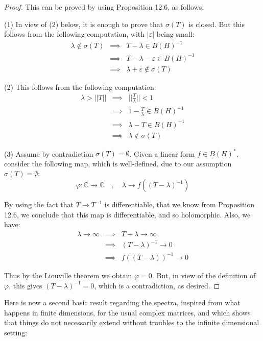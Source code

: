 \documentclass[12pt]{amsbook}
\begin{document}
\begin{proof}
This can be proved by using Proposition 12.6, as follows:

\medskip

(1) In view of (2) below, it is enough to prove that $\sigma(T)$ is closed. But this follows from the following computation, with $|\varepsilon|$ being small:
\begin{eqnarray*}
\lambda\notin\sigma(T)
&\implies&T-\lambda\in B(H)^{-1}\\
&\implies&T-\lambda-\varepsilon\in B(H)^{-1}\\
&\implies&\lambda+\varepsilon\notin\sigma(T)
\end{eqnarray*}

(2) This follows from the following computation:
\begin{eqnarray*}
\lambda>||T||
&\implies&\Big|\Big|\frac{T}{\lambda}\Big|\Big|<1\\
&\implies&1-\frac{T}{\lambda}\in B(H)^{-1}\\
&\implies&\lambda-T\in B(H)^{-1}\\
&\implies&\lambda\notin\sigma(T)
\end{eqnarray*}

(3) Assume by contradiction $\sigma(T)=\emptyset$. Given a linear form $f\in B(H)^*$, consider the following map, which is well-defined, due to our assumption $\sigma(T)=\emptyset$:
$$\varphi:\mathbb C\to\mathbb C\quad,\quad 
\lambda\to f((T-\lambda)^{-1})$$

By using the fact that $T\to T^{-1}$ is differentiable, that we know from Proposition 12.6, we conclude that this map is differentiable, and so holomorphic. Also, we have:
\begin{eqnarray*}
\lambda\to\infty
&\implies&T-\lambda\to\infty\\
&\implies&(T-\lambda)^{-1}\to0\\
&\implies&f((T-\lambda))^{-1}\to0
\end{eqnarray*}

Thus by the Liouville theorem we obtain $\varphi=0$. But, in view of the definition of $\varphi$, this gives $(T-\lambda)^{-1}=0$, which is a contradiction, as desired.
\end{proof}

Here is now a second basic result regarding the spectra, inspired from what happens in finite dimensions, for the usual complex matrices, and which shows that things do not necessarily extend without troubles to the infinite dimensional setting:
\end{document}
